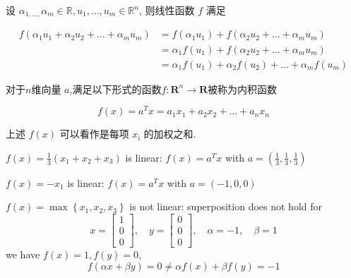 \begin{corollary}
    设 $ \alpha_{1, \ldots,} \alpha_{m} \in \mathbb{R}, u_{1}, \ldots, u_{m} \in \mathbb{R}^{n} $, 则线性函数 $ f $ 满足

    $$ \begin{aligned} f\left(\alpha_{1} u_{1}+\alpha_{2} u_{2}+\ldots+\alpha_{m} u_{m}\right) &=f\left(\alpha_{1} u_{1}\right)+f\left(\alpha_{2} u_{2}+\ldots+\alpha_{m} u_{m}\right) \\ &=\alpha_{1} f\left(u_{1}\right)+f\left(\alpha_{2} u_{2}+\ldots+\alpha_{m} u_{m}\right) \\ &=\alpha_{1} f\left(u_{1}\right)+\alpha_{2} f\left(u_{2}\right)+\ldots+\alpha_{m} f\left(u_{m}\right) \end{aligned} $$
\end{corollary}

\begin{definition}
    对于$n$维向量 $ a $,满足以下形式的函数$ f: \mathbf{R}^{n} \rightarrow \mathbf{R} $被称为内积函数

    $$ f(x)=a^{T} x=a_{1} x_{1}+a_{2} x_{2}+\ldots+a_{n} x_{n} $$
\end{definition}

上述 $ f(x) $ 可以看作是每项 $ x_{\mathrm{i}} $ 的加权之和. 

\begin{example}
    $ f(x)=\frac{1}{3}\left(x_{1}+x_{2}+x_{3}\right) $ is linear: $ f(x)=a^{T} x $ with $ a=\left(\frac{1}{3}, \frac{1}{3}, \frac{1}{3}\right) $
\end{example}

\begin{example}
    $ f(x)=-x_{1} $ is linear: $ f(x)=a^{T} x $ with $ a=(-1,0,0) $
\end{example}

\begin{example}
    $ f(x)=\max \left\{x_{1}, x_{2}, x_{3}\right\} $ is not linear: superposition does not hold for
$$
x=\left[\begin{array}{l}
1 \\
0 \\
0
\end{array}\right], \quad y=\left[\begin{array}{l}
0 \\
0 \\
0
\end{array}\right], \quad \alpha=-1, \quad \beta=1
$$
we have $ f(x)=1, f(y)=0 $,
$$
f(\alpha x+\beta y)=0 \neq \alpha f(x)+\beta f(y)=-1
$$
\end{example}


